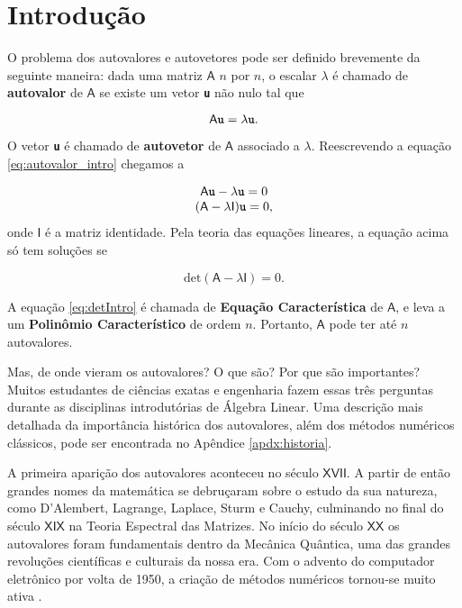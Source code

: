 \chapter{Introdução}
\label{cap:introducao}

\setcounter{page}{12}

	O problema dos autovalores e autovetores pode ser definido brevemente da seguinte maneira: dada uma matriz $\mathsf{A}$ $n$ por $n$, o escalar $\lambda$ é chamado de \textbf{autovalor} de $\mathsf{A}$ se existe um vetor \textbf{\texttt{u}} não nulo tal que

\begin{equation}\label{eq:autovalor_intro}
	\mathsf{A} \textbf{\texttt{u}} = \lambda \textbf{\texttt{u}}.
\end{equation}

O vetor \textbf{\texttt{u}} é chamado de \textbf{autovetor} de $\mathsf{A}$ associado a $\lambda$. Reescrevendo a equação \ref{eq:autovalor_intro} chegamos a 

\begin{equation}
		\begin{array}{c}
			\mathsf{A} \textbf{\texttt{u}} - \lambda \textbf{\texttt{u}} = 0 \\
			(\mathsf{A} - \lambda \mathsf{I})\textbf{\texttt{u}} = 0,
		\end{array}
\end{equation}
onde $\mathsf{I}$ é a matriz identidade. Pela teoria das equações lineares, a equação acima só tem soluções se

\begin{equation}\label{eq:detIntro}
	\mbox{det}(\mathsf{A} - \lambda \mathsf{I}) = 0.
\end{equation}

A equação \ref{eq:detIntro} é chamada de \textbf{Equação Característica} de $\mathsf{A}$, e leva a um \textbf{Polinômio Característico} de ordem $n$. Portanto, $\mathsf{A}$ pode ter até $n$ autovalores.

	Mas, de onde vieram os autovalores? O que são? Por que são importantes? Muitos estudantes de ciências exatas e engenharia fazem essas três perguntas durante as disciplinas introdutórias de Álgebra Linear. Uma descrição mais detalhada da importância histórica dos autovalores, além dos métodos numéricos clássicos, pode ser encontrada no Apêndice \ref{apdx:historia}.
	
	A primeira aparição dos autovalores aconteceu no século $\mathsf{XVII}$. A partir de então grandes nomes da matemática se debruçaram sobre o estudo da sua natureza, como D'Alembert, Lagrange, Laplace, Sturm e Cauchy, culminando no final do século $\mathsf{XIX}$ na Teoria Espectral das Matrizes. No início do século $\mathsf{XX}$ os autovalores foram fundamentais dentro da Mecânica Quântica, uma das grandes revoluções científicas e culturais da nossa era. Com o advento do computador eletrônico por volta de 1950, a criação de métodos numéricos tornou-se muito ativa \cite{Hawkins75}.
	
